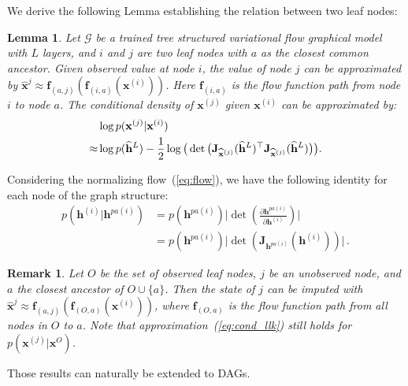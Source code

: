 \documentclass[twoside]{article}
\newtheorem{lemma}{Lemma}
\newtheorem{remark}{Remark}
\begin{document}
We derive the following Lemma establishing the relation between two leaf nodes:
\begin{lemma}\label{lm:apprx}
Let $\mathcal{G}$ be a trained tree structured variational flow graphical model with $L$ layers, and $i$ and $j$ are two leaf nodes with $a$ as the closest common ancestor. Given observed value at node $i$, the value of node $j$ can be approximated by   $\widehat{\mathbf{x}}^{j} \approx  \mathbf{f}_{(a,j)}(\mathbf{f}_{(i, a)}(\mathbf{x}^{(i)}))$. Here $\mathbf{f}_{(i, a)}$ is the flow function path from node $i$ to node $a$. The conditional density of $\mathbf{x}^{(j)}$ given $\mathbf{x}^{(i)}$ can be approximated by: 
\begin{align} \notag
& \log p(\mathbf{x}^{(j)} | \mathbf{x}^{(i)})\\ \label{eq:cond_llk}
\approx & \log p(\widehat{\mathbf{h}}^L) -  \frac{1}{2} \log \big(\det \big(\mathbf{J}_{\widehat{\mathbf{x}}^{(j)}}(\widehat{\mathbf{h}}^L)^\top\mathbf{J}_{\widehat{\mathbf{x}}^{(j)}}(\widehat{\mathbf{h}}^L)\big) \big).
\end{align}
\end{lemma}
Considering the normalizing flow~(\ref{eq:flow}), we have the following identity for each node of the graph structure:
\begin{align*}
p(\mathbf{h}^{(i)} | \mathbf{h}^{pa(i)}) & = p(\mathbf{h}^{pa(i)}) \big|\det(\frac{\partial \mathbf{h}^{pa(i)} }{\partial \mathbf{h}^{(i)}})\big| \\
& =
p(\mathbf{h}^{pa(i)}) \big|\det(\mathbf{J}_{\mathbf{h}^{pa(i)}}(\mathbf{h}^{(i)}))\big| \, .
\end{align*} 

\begin{remark}\label{rmk:apprx_mul}
Let $O$ be the set of observed leaf nodes, $j$ be an unobserved node, and $a$ the closest ancestor of $O \cup \{a\}$. 
Then the state of $j$ can be imputed with $\widehat{\mathbf{x}}^{j} \approx  \mathbf{f}_{(a,j)}(\mathbf{f}_{(O, a)}(\mathbf{x}^{(i)}))$, where $\mathbf{f}_{(O, a)}$ is the flow function path from all nodes in $O$ to $a$.
Note that approximation~(\ref{eq:cond_llk}) still holds for $p(\mathbf{x}^{(j)} | \mathbf{x}^{O})$.
\end{remark}
Those results can naturally be extended to DAGs.
\end{document}
